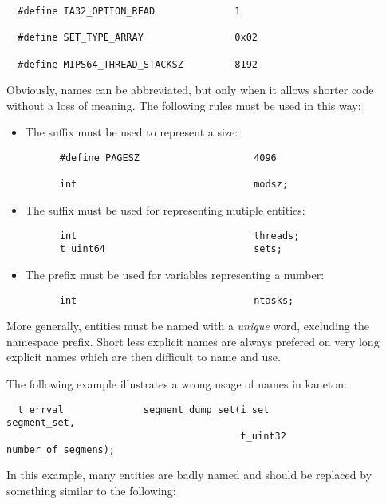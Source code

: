 \begin{verbatim}
  #define IA32_OPTION_READ              1

  #define SET_TYPE_ARRAY                0x02

  #define MIPS64_THREAD_STACKSZ         8192
\end{verbatim}

Obviously, names can be abbreviated, but only when it allows shorter code
without a loss of meaning. The following rules must be used in this way:

\begin{itemize}
  \item
    The suffix  must be used to represent a size:

    \begin{verbatim}
      #define PAGESZ                    4096

      int                               modsz;
    \end{verbatim}
  \item
    The  suffix must be used for representing mutiple entities:

    \begin{verbatim}
      int                               threads;
      t_uint64                          sets;
    \end{verbatim}
  \item
    The  prefix must be used for variables representing a number:

    \begin{verbatim}
      int                               ntasks;
    \end{verbatim}
\end{itemize}

More generally, entities must be named with a \textit{unique} word,
excluding the namespace prefix. Short less explicit names are always prefered
on very long explicit names which are then difficult to name and use.

The following example illustrates a wrong usage of names in kaneton:

\begin{verbatim}
  t_errval              segment_dump_set(i_set              segment_set,
                                         t_uint32           number_of_segmens);
\end{verbatim}

In this example, many entities are badly named and should be replaced by
something similar to the following:

